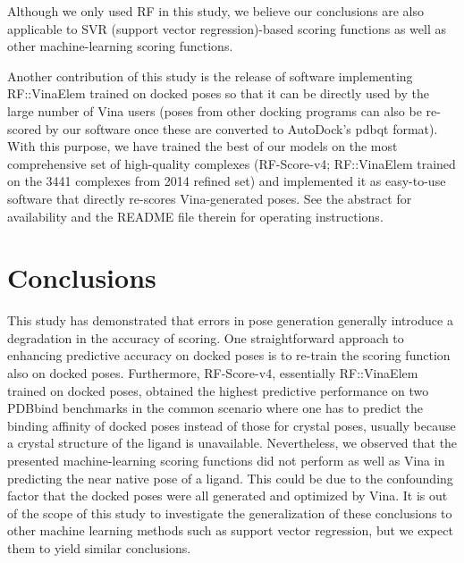 \documentclass[twocolumn]{bmcart}
\begin{document}
Although we only used RF in this study, we believe our conclusions are also applicable to SVR (support vector regression)-based scoring functions \cite{1295,963} as well as other machine-learning scoring functions.

Another contribution of this study is the release of software implementing RF::VinaElem trained on docked poses so that it can be directly used by the large number of Vina users (poses from other docking programs can also be re-scored by our software once these are converted to AutoDock’s pdbqt format). With this purpose, we have trained the best of our models on the most comprehensive set of high-quality complexes (RF-Score-v4; RF::VinaElem trained on the 3441 complexes from 2014 refined set) and implemented it as easy-to-use software that directly re-scores Vina-generated poses. See the abstract for availability and the README file therein for operating instructions.

\section*{Conclusions}

This study has demonstrated that errors in pose generation generally introduce a degradation in the accuracy of scoring. One straightforward approach to enhancing predictive accuracy on docked poses is to re-train the scoring function also on docked poses. Furthermore, RF-Score-v4, essentially RF::VinaElem trained on docked poses, obtained the highest predictive performance on two PDBbind benchmarks in the common scenario where one has to predict the binding affinity of docked poses instead of those for crystal poses, usually because a crystal structure of the ligand is unavailable. Nevertheless, we observed that the presented machine-learning scoring functions did not perform as well as Vina in predicting the near native pose of a ligand. This could be due to the confounding factor that the docked poses were all generated and optimized by Vina. It is out of the scope of this study to investigate the generalization of these conclusions to other machine learning methods such as support vector regression, but we expect them to yield similar conclusions.

\end{document}
